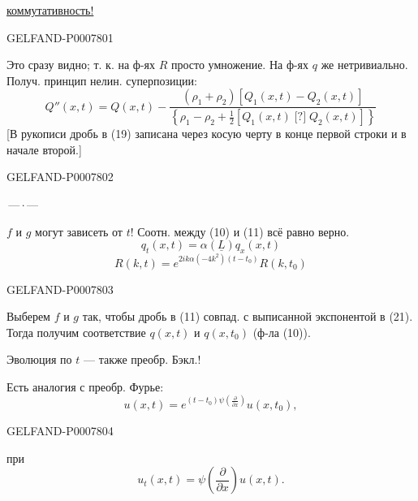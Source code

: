 \underline{коммутативность!}


\begin{GelfandAdjacentEvidence}{GELFAND-P000780}{1}

Это сразу видно; т. к. на ф-ях \(R\) просто умножение.
На ф-ях \(q\) же нетривиально.
Получ. принцип нелин. суперпозиции:
\begin{equation}
Q''(x,t)=Q(x,t)-
\frac{(\rho_1+\rho_2)[Q_1(x,t)-Q_2(x,t)]}
{\left\{\rho_1-\rho_2+\tfrac12[Q_1(x,t)\mathbin{\text{[?]}}Q_2(x,t)]\right\}}
\tag{19}
\end{equation}
[В рукописи дробь в (19) записана через косую черту в конце первой строки и в начале второй.]
\end{GelfandAdjacentEvidence}
\begin{GelfandAdjacentEvidence}{GELFAND-P000780}{2}


\begin{center}\(\text{---}\,\cdot\,\text{---}\)\end{center}

\(f\) и \(g\) могут зависеть от \(t\)!
Соотн. между (10) и (11) всё равно верно.
\begin{equation}
q_t(x,t)=\alpha(\underline L)q_x(x,t)\tag{20}
\end{equation}
\begin{equation}
R(k,t)=e^{2ik\alpha(-4k^2)(t-t_0)}R(k,t_0)\tag{21}
\end{equation}
\end{GelfandAdjacentEvidence}
\begin{GelfandAdjacentEvidence}{GELFAND-P000780}{3}


Выберем \(f\) и \(g\) так, чтобы дробь в (11) совпад. с выписанной экспонентой в (21).
Тогда получим соответствие \(q(x,t)\) и \(q(x,t_0)\) (ф-ла (10)).

Эволюция по \(t\) --- также преобр. Бэкл.!

Есть аналогия с преобр. Фурье:
\[
u(x,t)=e^{(t-t_0)\psi(\frac{\partial}{\partial x})}u(x,t_0),
\]
\end{GelfandAdjacentEvidence}
\begin{GelfandAdjacentEvidence}{GELFAND-P000780}{4}

при
\[
u_t(x,t)=\psi\left(\frac{\partial}{\partial x}\right)u(x,t).
\]
\end{GelfandAdjacentEvidence}

